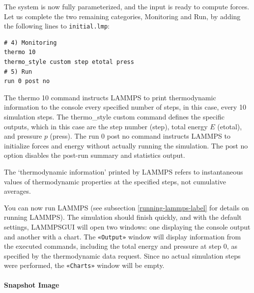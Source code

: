 \documentclass[9pt,tutorial]{livecoms}
\newcommand{\lmpcmd}[1]{\hspace{0pt}\colorbox{listing}{\textcolor{command}{\small{#1}}}\hspace{0pt}} %
\newcommand{\flecmd}[1]{\textcolor{command}{\texttt{#1}}} %
\newcommand{\guicmd}[1]{\textcolor{command}{\texttt{«#1»}}} %
\newcommand{\lammpsgui}{\textsf{LAMMPS\textendash GUI}}
\begin{document}
The system is now fully parameterized, and the input is ready to compute
forces.  Let us complete the two remaining categories,
\lmpcmd{Monitoring} and \lmpcmd{Run}, by adding the following lines
to \flecmd{initial.lmp}:
\begin{lstlisting}
# 4) Monitoring
thermo 10
thermo_style custom step etotal press
# 5) Run
run 0 post no
\end{lstlisting}
The \lmpcmd{thermo 10} command instructs LAMMPS to print thermodynamic
information to the console every specified number of steps, in this case,
every 10 simulation steps.  The \lmpcmd{thermo\_style custom} command
defines the specific outputs, which in this case are the step number
(\lmpcmd{step}), total energy $E$ (\lmpcmd{etotal}), and pressure $p$ (\lmpcmd{press}).
The \lmpcmd{run 0 post no} command instructs LAMMPS to initialize forces and energy
without actually running the simulation.  The \lmpcmd{post no} option disables
the post-run summary and statistics output.

\begin{note}
{\color{blue}The `thermodynamic information' printed by LAMMPS refers to instantaneous values
of thermodynamic properties at the specified steps, not cumulative averages.}
\end{note}

You can now run LAMMPS {\color{blue}(see subsection \ref{running-lammps-label}
for details on running LAMMPS)}.  The simulation should finish quickly, and with the default
settings, \lammpsgui{} will open two windows: one displaying the console
output and another with a chart.  The \guicmd{Output} window will display information from
the executed commands, including the total energy and pressure at step 0,
as specified by the thermodynamic data request.  Since no actual simulation
steps were performed, the \guicmd{Charts} window will be empty.

\paragraph{Snapshot Image}
\end{document}
